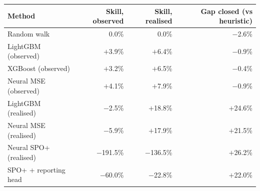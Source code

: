 \begin{tabular}{lrrr}
\toprule
Method & Skill, observed & Skill, realised & Gap closed (vs heuristic)\\
\midrule
Random walk & 0.0\% & 0.0\% & $-$2.6\%\\
LightGBM (observed) & $+$3.9\% & $+$6.4\% & $-$0.9\%\\
XGBoost (observed) & $+$3.2\% & $+$6.5\% & $-$0.4\%\\
Neural MSE (observed) & $+$4.1\% & $+$7.9\% & $-$0.9\%\\
LightGBM (realised) & $-$2.5\% & $+$18.8\% & $+$24.6\%\\
Neural MSE (realised) & $-$5.9\% & $+$17.9\% & $+$21.5\%\\
Neural SPO+ (realised) & $-$191.5\% & $-$136.5\% & $+$26.2\%\\
SPO+ + reporting head & $-$60.0\% & $-$22.8\% & $+$22.0\%\\
\bottomrule
\end{tabular}